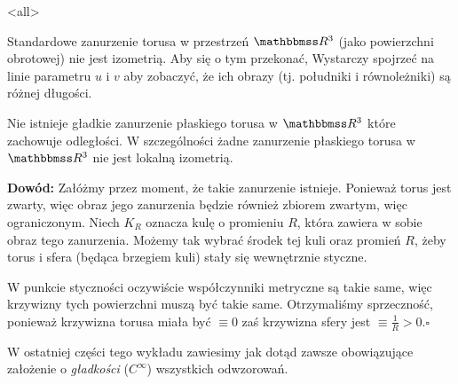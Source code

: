 \mode<all>{}

\begin{frame}
Standardowe zanurzenie torusa w przestrzeń $\R^3$ (jako powierzchni obrotowej) nie jest izometrią. Aby się o tym przekonać, Wystarczy spojrzeć na linie parametru $u$ i $v$ aby zobaczyć, że ich obrazy (tj. południki i równoleżniki) są różnej długości. 

\begin{center}

\end{center}


\end{frame}

\begin{frame}
\begin{twierdzenie}
Nie istnieje gładkie zanurzenie płaskiego torusa w $\R^3$ które zachowuje odległości. W szczególności żadne zanurzenie płaskiego torusa w $\R^3$ nie jest lokalną izometrią.
\end{twierdzenie}

\pause \textcolor{ared}{\textbf{Dowód:}}\newline
Załóżmy przez moment, że takie zanurzenie istnieje. Ponieważ torus jest zwarty, więc obraz jego zanurzenia będzie również zbiorem zwartym, więc ograniczonym. Niech $K_{R}$ oznacza kulę o promieniu $R$, która zawiera w sobie obraz tego zanurzenia. Możemy tak wybrać środek tej kuli oraz promień $R$, żeby torus i sfera (będąca brzegiem kuli) stały się wewnętrznie styczne.
\end{frame}

\begin{frame}
\begin{center}

\end{center}

W punkcie styczności oczywiście współczynniki metryczne są takie same, więc krzywizny tych powierzchni muszą być takie same. Otrzymaliśmy sprzeczność, ponieważ krzywizna torusa miała być $\equiv 0$ zaś krzywizna sfery jest $\equiv \frac{1}{R}>0$.\hfill $\square$

\end{frame}

\begin{frame}
\begin{uwaga}
W ostatniej części tego wykładu zawiesimy jak dotąd zawsze obowiązujące
założenie o \textit{gładkości} ($C^\infty$) wszystkich odwzorowań.
\end{uwaga}
\end{frame}


